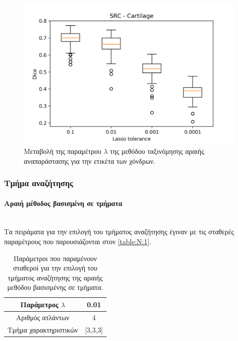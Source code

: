 \documentclass[a4paper,12pt]{article}
\newcommand{\paragraphLine}[1]{\paragraph{#1}\mbox{}\\}
\begin{document}
\begin{figure}[H]
    \centering
    \includegraphics[width=0.85\linewidth]{SRC_Lasso_tolerance_Cartilage_plot.png}
    \caption{Μεταβολή της παραμέτρου $\lambda$ της μεθόδου ταξινόμησης αραιής
             αναπαράστασης για την ετικέτα των χόνδρων.}
    \label{fig:SRC:lambda:3}
\end{figure}


\subsubsection{Τμήμα αναζήτησης}

\paragraphLine{Αραιή μέθοδος βασισμένη σε τμήματα}

Τα πειράματα για την επιλογή του τμήματος αναζήτησης έγιναν με τις σταθερές
παραμέτρους που παρουσιάζονται στον \autoref{table:N:1}.

\begin{table}[h!]
    \centering
    \begin{tabular}{|c|c|} 
        \hline
        Παράμετρος $\lambda$ & 0.01 \\ 
        \hline
        Αριθμός ατλάντων & 4 \\ 
        \hline
        Τμήμα χαρακτηριστικών & [3,3,3] \\ 
        \hline
    \end{tabular}
    \caption{Παράμετροι που παραμένουν σταθεροί για την επιλογή του τμήματος
             αναζήτησης της αραιής μεθόδου βασισμένης σε τμήματα.}
    \label{table:N:1}
\end{table}
\end{document}
